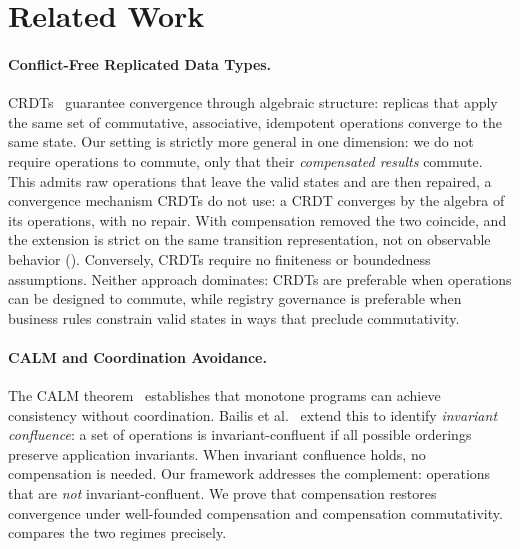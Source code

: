 \documentclass[11pt,a4paper]{article}
\theoremstyle{plain}
\theoremstyle{definition}
\theoremstyle{remark}
\begin{document}
\section{Related Work}
\label{sec:related}

\paragraph{Conflict-Free Replicated Data Types.}
CRDTs~\cite{shapiro2011crdt} guarantee convergence through algebraic
structure: replicas that apply the same set of commutative, associative,
idempotent operations converge to the same state.  Our setting is strictly more
general in one dimension: we do not require operations to commute, only that
their \emph{compensated results} commute.  This admits raw operations that
leave the valid states and are then repaired, a convergence mechanism CRDTs do
not use: a CRDT converges by the algebra of its operations, with no repair.
With compensation removed the two coincide, and the extension is strict on the
same transition representation, not on observable behavior
().  Conversely,
CRDTs require no finiteness or boundedness assumptions.  Neither approach
dominates: CRDTs are preferable when operations can be designed to commute,
while registry governance is preferable when business rules constrain valid
states in ways that preclude commutativity.

\paragraph{CALM and Coordination Avoidance.}
The CALM theorem~\cite{hellerstein2010declarative,ameloot2013relational}
establishes that monotone programs can achieve consistency without coordination.
Bailis et al.~\cite{bailis2014coordination} extend this to identify
\emph{invariant confluence}: a set of operations is invariant-confluent if all
possible orderings preserve application invariants.  When invariant confluence
holds, no compensation is needed.  Our framework addresses the complement:
operations that are \emph{not} invariant-confluent.  We prove that
compensation restores convergence under well-founded compensation and
compensation commutativity.   compares the two regimes
precisely.
\end{document}
